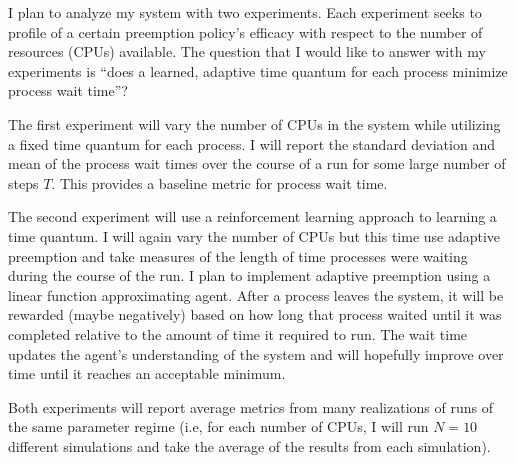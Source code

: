 \documentclass{article}
\begin{document}
I plan to analyze my system with two experiments. Each experiment seeks to profile of a certain preemption policy's 
efficacy with respect to the number of resources (CPUs) available. 
The question that I would like to answer with my experiments is ``does a learned, adaptive time quantum for each process minimize process wait time''?\par
The first experiment will vary the number
of CPUs in the system while utilizing a fixed time quantum for each process. 
I will report the standard deviation and mean of the process wait times over the course of a run for some large number of steps $T$.
This provides a baseline metric for process wait time. \par
The second experiment will use a reinforcement learning approach to learning a time quantum. 
I will again vary the number of CPUs but this time use adaptive preemption and take measures of the length of time processes were waiting during the course of the run.
I plan to implement adaptive preemption using a linear function approximating agent. After a process leaves the system, it will be rewarded (maybe negatively) based on how long that process waited until it was completed relative to
the amount of time it required to run. 
The wait time updates the agent's understanding of the system and will hopefully improve over time until it reaches an acceptable minimum.\par
Both experiments will report average metrics from many realizations of runs of the same parameter regime (i.e, for each number of CPUs, I will run $N=10$ different simulations and take the average of the results from each simulation).
\end{document}
